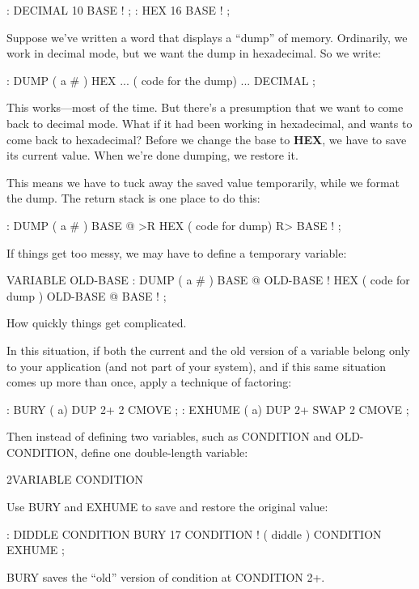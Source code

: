 \begin{Code}
: DECIMAL   10 BASE ! ;
: HEX   16 BASE ! ;
\end{Code}
Suppose we've written a word that displays a ``dump'' of memory. Ordinarily,
we work in decimal mode, but we want the dump in hexadecimal. So we write:

\begin{Code}
: DUMP  ( a # )
   HEX   ...   ( code for the dump) ... DECIMAL ;
\end{Code}
This works---most of the time. But there's a presumption that we want to
come back to decimal mode. What if it had been working in hexadecimal,
and wants to come back to hexadecimal? Before we change the base to
\textbf{HEX}, we have to save its current value. When we're done dumping, we
restore it.

This means we have to tuck away the saved value temporarily,
while we format the dump. The return stack is one place to do this:

\begin{Code}
: DUMP  ( a # )
   BASE @ >R  HEX   ( code for dump)  R> BASE ! ;
\end{Code}
If things get too messy, we may have to define a temporary variable:

\begin{Code}
VARIABLE OLD-BASE
: DUMP  ( a # )
   BASE @  OLD-BASE !  HEX ( code for dump )
   OLD-BASE @  BASE ! ;
\end{Code}
How quickly things get complicated.

In this situation, if both the current and the old version of a variable
belong only to your application (and not part of your system), and if this
same situation comes up more than once, apply a technique of factoring:

\begin{Code}
: BURY  ( a)  DUP 2+  2 CMOVE ;
: EXHUME  ( a)  DUP 2+  SWAP 2 CMOVE ;
\end{Code}
Then instead of defining two variables, such as CONDITION and
OLD-CONDITION, define one double-length variable:

\begin{Code}
2VARIABLE CONDITION
\end{Code}
Use BURY and EXHUME to save and restore the original value:

\begin{Code}
: DIDDLE    CONDITION BURY  17 CONDITION !  ( diddle )
   CONDITION EXHUME ;
\end{Code}
BURY saves the ``old'' version of condition at CONDITION 2+.

